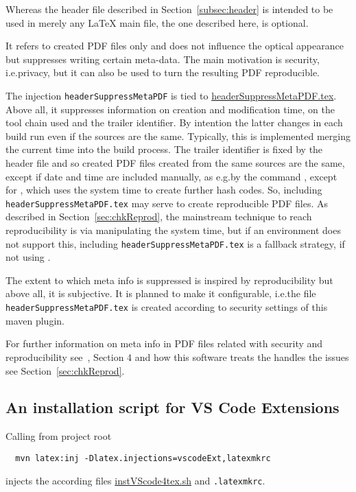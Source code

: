 Whereas the header file described in Section~\ref{subsec:header} is intended to be used 
in merely any \LaTeX{} main file, 
the one described here, is optional. 

It refers to created PDF files only and does not influence the optical appearance 
but suppresses writing certain meta-data. 
The main motivation is security, i.e.\@ privacy, 
but it can also be used to turn the resulting PDF reproducible. 

The injection \texttt{headerSuppressMetaPDF} 
is tied to \href{\urlSite fromTex/headerSuppressMetaPDF.tex}{headerSuppressMetaPDF.tex}. 
Above all, it suppresses information on creation and modification time, on the tool chain used 
and the trailer identifier. 
By intention the latter changes in each build run even if the sources are the same. 
Typically, this is implemented merging the current time into the build process. 
The trailer identifier is fixed by the header file 
and so created PDF files created from the same sources are the same, 
except if date and time are included manually, as e.g.\@ by the command , 
except for \xelatex, which uses the system time to create further hash codes. 
So, including \texttt{headerSuppressMetaPDF.tex} may serve to create reproducible PDF files. 
As described in Section~\ref{sec:chkReprod}, 
the mainstream technique to reach reproducibility 
is via manipulating the system time, 
but if an environment does not support this, 
including \texttt{headerSuppressMetaPDF.tex} is a fallback strategy, 
if not using \xelatex. 

The extent to which meta info is suppressed is inspired by reproducibility 
but above all, it is subjective. 
It is planned to make it configurable, 
i.e.\@ the file \texttt{headerSuppressMetaPDF.tex} 
is created according to security settings of this maven plugin. 

For further information on meta info in PDF files 
related with security and reproducibility 
see~\cite{LatexGen}, Section 4 
and how this software treats the handles the issues 
see Section~\ref{sec:chkReprod}. 


\subsection{An installation script for VS Code Extensions }\label{subsec:instExtVsCode}

Calling from project root 
%
\begin{Verbatim}
  mvn latex:inj -Dlatex.injections=vscodeExt,latexmkrc
\end{Verbatim}
%
injects the according files \href{\urlSite fromMain/instVScode4tex}{instVScode4tex.sh} and \texttt{.latexmkrc}. 

